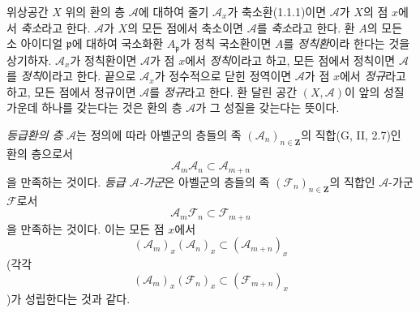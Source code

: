 \begin{env}[4.1.4]
\label{0.4.1.4-ko}
위상공간 $X$ 위의 환의 층 $\mathcal A$에 대하여 줄기 $\mathcal A_x$가 축소환(1.1.1)이면 $\mathcal A$가 $X$의 점 $x$에서 \emph{축소}라고 한다. $\mathcal A$가 $X$의 모든 점에서 축소이면 $\mathcal A$를 \emph{축소}라고 한다. 환 $A$의 모든 소 아이디얼 $\mathfrak p$에 대하여 국소화환 $A_{\mathfrak p}$가 정칙 국소환이면 $A$를 \emph{정칙환}이라 한다는 것을 상기하자. $\mathcal A_x$가 정칙환이면 $\mathcal A$가 점 $x$에서 \emph{정칙}이라고 하고, 모든 점에서 정칙이면 $\mathcal A$를 \emph{정칙}이라고 한다. 끝으로 $\mathcal A_x$가 정수적으로 닫힌 정역이면 $\mathcal A$가 점 $x$에서 \emph{정규}라고 하고, 모든 점에서 정규이면 $\mathcal A$를 \emph{정규}라고 한다. 환 달린 공간 $(X,\mathcal A)$이 앞의 성질 가운데 하나를 갖는다는 것은 환의 층 $\mathcal A$가 그 성질을 갖는다는 뜻이다.

\emph{등급환의 층} $\mathcal A$는 정의에 따라 아벨군의 층들의 족 $(\mathcal A_n)_{n\in\mathbf Z}$의 직합(G, II, 2.7)인 환의 층으로서
\[
  \mathcal A_m\mathcal A_n
  \subset\mathcal A_{m+n}
\]
을 만족하는 것이다. \emph{등급 $\mathcal A$-가군}은 아벨군의 층들의 족 $(\mathcal F_n)_{n\in\mathbf Z}$의 직합인 $\mathcal A$-가군 $\mathcal F$로서
\[
  \mathcal A_m\mathcal F_n
  \subset\mathcal F_{m+n}
\]
을 만족하는 것이다. 이는 모든 점 $x$에서
\[
  (\mathcal A_m)_x(\mathcal A_n)_x
  \subset(\mathcal A_{m+n})_x
\]
(각각
\[
  (\mathcal A_m)_x(\mathcal F_n)_x
  \subset(\mathcal F_{m+n})_x
\]
)가 성립한다는 것과 같다.
\end{env}

